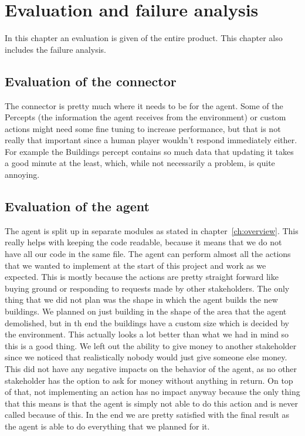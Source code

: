 \chapter{Evaluation and failure analysis}
In this chapter an evaluation is given of the entire product. This chapter also includes the failure analysis. 

\section{Evaluation of the connector}
The connector is pretty much where it needs to be for the agent.
Some of the Percepts (the information the agent receives from the environment) or custom actions might need some fine tuning to increase performance, but that is not really that important since a human player wouldn't respond immediately either.
For example the Buildings percept contains so much data that updating it takes a good minute at the least, which, while not necessarily a problem, is quite annoying.

\section{Evaluation of the agent}
The agent is split up in separate modules as stated in chapter~\ref{ch:overview}.
This really helps with keeping the code readable, because it means that we do not have all our code in the same file.
The agent can perform almost all the actions that we wanted to implement at the start of this project and work as we expected.
This is mostly because the actions are pretty straight forward like buying ground or responding to requests made by other stakeholders.
The only thing that we did not plan was the shape in which the agent builds the new buildings. We planned on just building in the shape of the area that the agent demolished, but in th end the buildings have a custom size which is decided by the environment. This actually looks a lot better than what we had in mind so this is a good thing.
We left out the ability to give money to another stakeholder since we noticed that realistically nobody would just give someone else money. 
This did not have any negative impacts on the behavior of the agent, as no other stakeholder has the option to ask for money without anything in return.
On top of that, not implementing an action has no impact anyway because the only thing that this means is that the agent is simply not able to do this action and is never called because of this. In the end we are pretty satisfied with the final result as the agent is able to do everything that we planned for it. 

